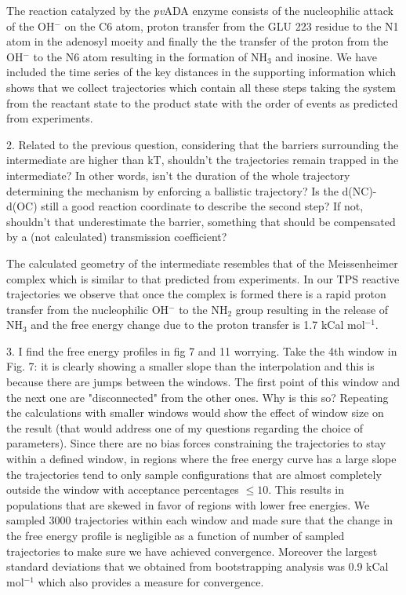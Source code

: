 \documentclass[journal=jpcbfk,manuscript=article,layout=traditional]{achemso}
\begin{document}
{\begin{response}
The reaction catalyzed by the \textit{pv}ADA enzyme consists of 
the nucleophilic attack of the OH$^{-}$ on the C6 atom, proton transfer from the 
GLU 223 residue to the N1 atom in the adenosyl moeity and finally the 
the transfer of the proton from the OH$^{-}$ to the N6 atom resulting in the formation 
of NH$_3$ and inosine. We have included the time series of the key distances in 
the supporting information which shows that we collect trajectories which contain all these
steps taking the system from the reactant state to the product state with the order of events
as predicted from experiments. 
\end{response}

\begin{response}{2. Related to the previous question, considering that the barriers 
surrounding the intermediate are higher than kT, shouldn't the trajectories remain 
trapped in the intermediate? In other words, isn't the duration of the whole trajectory 
determining the mechanism by enforcing a ballistic trajectory? Is the d(NC)-d(OC) still 
a good reaction coordinate to describe the second step? If not, shouldn't that underestimate 
the barrier, something that should be compensated by a (not calculated) transmission coefficient?}

The calculated geometry of the intermediate resembles that of the Meissenheimer complex which is
similar to that predicted from experiments. In our TPS reactive trajectories we observe that 
once the complex is formed there is a rapid proton transfer from the nucleophilic OH$^{-}$ 
to the NH$_2$ group resulting in the release of NH$_3$ and the free energy change due to the 
proton transfer is 1.7 kCal mol$^{-1}$. 
\end{response}

\begin{response}
{3. I find the free energy profiles in fig 7 and 11 worrying. Take the 4th window in 
Fig. 7: it is clearly showing a smaller slope than the interpolation and this is because 
there are jumps between the windows. The first point of this window and the next one are 
"disconnected" from the other ones. Why is this so? Repeating the calculations with smaller 
windows would show the effect of window size on the result (that would address one of my 
questions regarding the choice of parameters).}
Since there are no bias forces constraining the trajectories to stay within a defined window, 
in regions where the free energy curve has a large slope the trajectories tend to only sample 
configurations that are almost completely outside the window with acceptance percentages $\leq 10$.
This results in populations that are skewed in favor of regions with lower free energies. We sampled 
3000 trajectories within each window and made sure that the change in the free energy profile
is negligible as a function of number of sampled trajectories to make sure we have achieved 
convergence. Moreover the largest standard deviations that we obtained from bootstrapping 
analysis was 0.9 kCal mol$^{-1}$ which also provides a measure for convergence. 


\end{response}}
\end{document}
